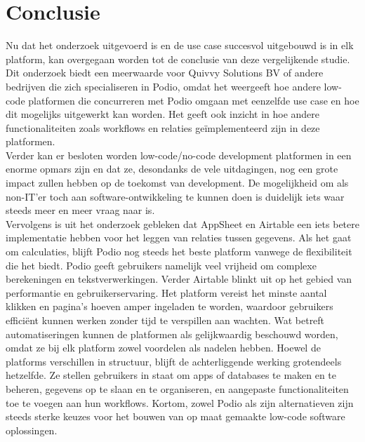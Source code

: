 
\chapter{Conclusie}%
\label{ch:conclusie}


Nu dat het onderzoek uitgevoerd is en de use case succesvol uitgebouwd is in elk platform, kan overgegaan worden tot de conclusie van deze vergelijkende studie. \\

Dit onderzoek biedt een meerwaarde voor Quivvy Solutions BV of andere bedrijven die zich specialiseren in Podio, omdat het weergeeft hoe andere low-code platformen die concurreren met Podio omgaan met eenzelfde use case en hoe dit mogelijks uitgewerkt kan worden. Het geeft ook inzicht in hoe andere functionaliteiten zoals workflows en relaties geïmplementeerd zijn in deze platformen. \\

Verder kan er besloten worden low-code/no-code development platformen in een enorme opmars zijn en dat ze, desondanks de vele uitdagingen, nog een grote impact zullen hebben op de toekomst van development. De mogelijkheid om als non-IT'er toch aan software-ontwikkeling te kunnen doen is duidelijk iets waar steeds meer en meer vraag naar is. \\

Vervolgens is uit het onderzoek gebleken dat AppSheet en Airtable een iets betere implementatie hebben voor het leggen van relaties tussen gegevens. Als het gaat om calculaties, blijft Podio nog steeds het beste platform vanwege de flexibiliteit die het biedt. Podio geeft gebruikers namelijk veel vrijheid om complexe berekeningen en tekstverwerkingen. Verder Airtable blinkt uit op het gebied van performantie en gebruikerservaring. Het platform vereist het minste aantal klikken en pagina's hoeven amper ingeladen te worden, waardoor gebruikers efficiënt kunnen werken zonder tijd te verspillen aan wachten. Wat betreft automatiseringen kunnen de platformen als gelijkwaardig beschouwd worden, omdat ze bij elk platform zowel voordelen als nadelen hebben. Hoewel de platforms verschillen in structuur, blijft de achterliggende werking grotendeels hetzelfde. Ze stellen gebruikers in staat om apps of databases te maken en te beheren, gegevens op te slaan en te organiseren, en aangepaste functionaliteiten toe te voegen aan hun workflows. Kortom, zowel Podio als zijn alternatieven zijn steeds sterke keuzes voor het bouwen van op maat gemaakte low-code software oplossingen. \\

